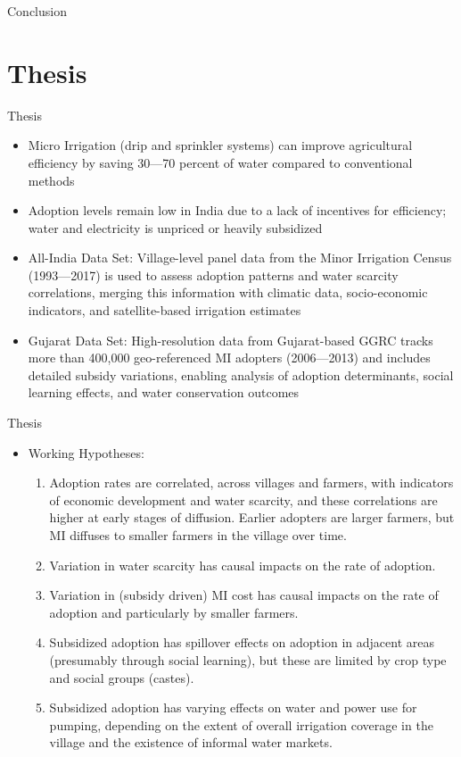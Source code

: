\documentclass[10pt]{beamer}
\begin{document}
\begin{frame}
	{Conclusion}
\end{frame}

\section{Thesis}
\begin{frame}
	{Thesis}
	\begin{itemize}
		\item Micro Irrigation (drip and sprinkler systems) can improve agricultural efficiency by saving 30—70 percent of water compared to conventional methods
		\item Adoption levels remain low in India due to a lack of incentives for efficiency; water and electricity is unpriced or heavily subsidized
		\item All-India Data Set: Village-level panel data from the Minor Irrigation Census (1993—2017) is used to assess adoption patterns and water scarcity correlations, merging this information with climatic data, socio-economic indicators, and satellite-based irrigation estimates
		\item Gujarat Data Set: High-resolution data from Gujarat-based GGRC tracks more than 400,000 geo-referenced MI adopters (2006—2013) and includes detailed subsidy variations, enabling analysis of adoption determinants, social learning effects, and water conservation outcomes
	\end{itemize}
\end{frame}


\begin{frame}
	{Thesis}
	\begin{itemize}
		\item Working Hypotheses:
		      \begin{enumerate}
			      \item Adoption rates are correlated, across villages and farmers, with indicators of economic development and water scarcity, and these correlations are higher at early stages of diffusion. Earlier adopters are larger farmers, but MI diffuses to smaller farmers in the village over time.
			      \item Variation in water scarcity has causal impacts on the rate of adoption.
			      \item Variation in (subsidy driven) MI cost has causal impacts on the rate of adoption and particularly by smaller farmers.
			      \item Subsidized adoption has spillover effects on adoption in adjacent areas (presumably through social learning), but these are limited by crop type and social groups (castes).
			      \item Subsidized adoption has varying effects on water and power use for pumping, depending on the extent of overall irrigation coverage in the village and the existence of informal water markets.
		      \end{enumerate}
	\end{itemize}
\end{frame}


\end{document}
